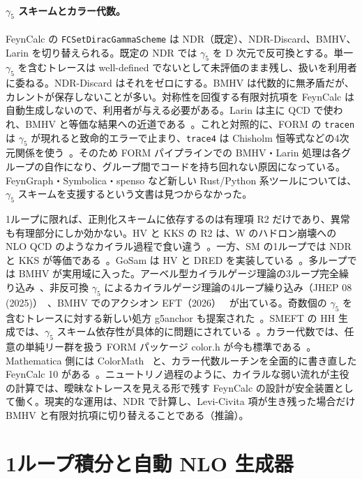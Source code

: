 \documentclass[a4paper,10pt]{ltjsarticle}
\begin{document}
\paragraph{$\gamma_5$ スキームとカラー代数。}FeynCalc の \texttt{FCSetDiracGammaScheme} は NDR（既定）、NDR-Discard、BMHV、Larin を切り替えられる。既定の NDR では $\gamma_5$ を D 次元で反可換とする。単一 $\gamma_5$ を含むトレースは well-defined でないとして未評価のまま残し、扱いを利用者に委ねる。NDR-Discard はそれをゼロにする。BMHV は代数的に無矛盾だが、カレントが保存しないことが多い。対称性を回復する有限対抗項を FeynCalc は自動生成しないので、利用者が与える必要がある。Larin は主に QCD で使われ、BMHV と等価な結果への近道である~\cite{r29}。これと対照的に、FORM の \texttt{tracen} は $\gamma_5$ が現れると致命的エラーで止まり、\texttt{trace4} は Chisholm 恒等式などの4次元関係を使う~\cite{r30}。そのため FORM パイプラインでの BMHV・Larin 処理は各グループの自作になり、グループ間でコードを持ち回れない原因になっている。FeynGraph・Symbolica・spenso など新しい Rust/Python 系ツールについては、$\gamma_5$ スキームを支援するという文書は見つからなかった。

1ループに限れば、正則化スキームに依存するのは有理項 R2 だけであり、異常も有理部分にしか効かない。HV と KKS の R2 は、W のハドロン崩壊への NLO QCD のようなカイラル過程で食い違う~\cite{r31}。一方、SM の1ループでは NDR と KKS が等価である~\cite{r32}。GoSam は HV と DRED を実装している~\cite{r33}。多ループでは BMHV が実用域に入った。アーベル型カイラルゲージ理論の3ループ完全繰り込み~\cite{r34}、非反可換 $\gamma_5$ によるカイラルゲージ理論の4ループ繰り込み（JHEP 08 (2025)）~\cite{r35}、BMHV でのアクシオン EFT（2026）~\cite{r36} が出ている。奇数個の $\gamma_5$ を含むトレースに対する新しい処方 g5anchor も提案された~\cite{r37}。SMEFT の HH 生成では、$\gamma_5$ スキーム依存性が具体的に問題にされている~\cite{r38}。カラー代数では、任意の単純リー群を扱う FORM パッケージ color.h が今も標準である~\cite{r39}。Mathematica 側には ColorMath~\cite{r40} と、カラー代数ルーチンを全面的に書き直した FeynCalc 10 がある~\cite{r41}。ニュートリノ過程のように、カイラルな弱い流れが主役の計算では、曖昧なトレースを見える形で残す FeynCalc の設計が安全装置として働く。現実的な運用は、NDR で計算し、Levi-Civita 項が生き残った場合だけ BMHV と有限対抗項に切り替えることである（推論）。


\section{1ループ積分と自動 NLO 生成器}\label{sec:oneloop}
\end{document}
